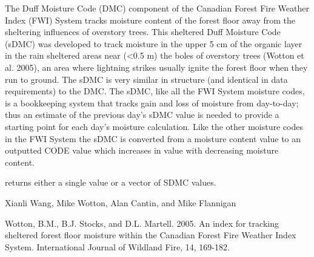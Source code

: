 \documentclass[a4paper]{book}
\begin{document}
%
\begin{Details}\relax
The Duff Moisture Code (DMC) component of the Canadian Forest Fire Weather
Index (FWI) System tracks moisture content of the forest floor away from the
sheltering influences of overstory trees.  This sheltered Duff Moisture Code
(sDMC) was developed to track moisture in the upper 5 cm of the organic
layer in the rain sheltered areas near (<0.5 m) the boles of overstory trees
(Wotton et al. 2005), an area where lightning strikes usually ignite the
forest floor when they run to ground. The sDMC is very similar in structure
(and identical in data requirements) to the DMC.  The sDMC, like all the FWI
System moisture codes, is a bookkeeping system that tracks gain and loss of
moisture from day-to-day; thus an estimate of the previous day's sDMC value
is needed to provide a starting point for each day's moisture calculation.
Like the other moisture codes in the FWI System the sDMC is converted from a
moisture content value to an outputted CODE value which increases in value
with decreasing moisture content.
\end{Details}
%
\begin{Value}
 returns either a single value or a vector of SDMC
values.
\end{Value}
%
\begin{Author}\relax
Xianli Wang, Mike Wotton, Alan Cantin, and Mike Flannigan
\end{Author}
%
\begin{References}\relax
Wotton, B.M., B.J. Stocks, and D.L. Martell. 2005. An index for
tracking sheltered forest floor moisture within the Canadian Forest Fire
Weather Index System. International Journal of Wildland Fire, 14, 169-182.
\end{References}
%
\begin{SeeAlso}\relax
{}
\end{SeeAlso}
%
\begin{Examples}
\end{Examples}
\end{document}
